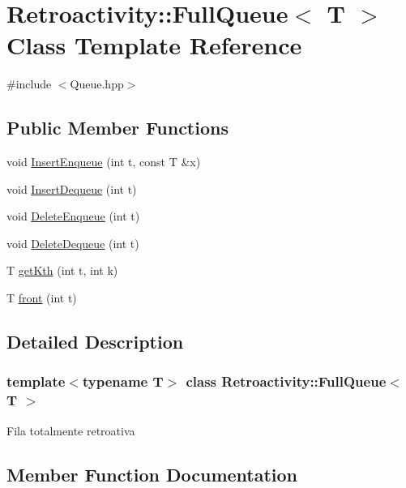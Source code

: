 \hypertarget{classRetroactivity_1_1FullQueue}{}\section{Retroactivity\+:\+:Full\+Queue$<$ T $>$ Class Template Reference}
\label{classRetroactivity_1_1FullQueue}


{\ttfamily \#include $<$Queue.\+hpp$>$}

\subsection*{Public Member Functions}
\begin{DoxyCompactItemize}
\item 
void \hyperlink{classRetroactivity_1_1FullQueue_a200afe69110074321a9f2b56ffc2e10f}{Insert\+Enqueue} (int t, const T \&x)
\item 
void \hyperlink{classRetroactivity_1_1FullQueue_acbdabeb03cf244b842df59fd64b86592}{Insert\+Dequeue} (int t)
\item 
void \hyperlink{classRetroactivity_1_1FullQueue_a017c3413e3df46315b1ffe23fdb9f52e}{Delete\+Enqueue} (int t)
\item 
void \hyperlink{classRetroactivity_1_1FullQueue_a45493d6d81b3982c43de25bc24a0d40f}{Delete\+Dequeue} (int t)
\item 
T \hyperlink{classRetroactivity_1_1FullQueue_a8924244b17024f26880e5dbc6b97ffdf}{get\+Kth} (int t, int k)
\item 
T \hyperlink{classRetroactivity_1_1FullQueue_ac29fbed2c33d09c0a7aac91fc26a0dd2}{front} (int t)
\end{DoxyCompactItemize}


\subsection{Detailed Description}
\subsubsection*{template$<$typename T$>$\newline
class Retroactivity\+::\+Full\+Queue$<$ T $>$}

Fila totalmente retroativa 

\subsection{Member Function Documentation}
\mbox{\label{classRetroactivity_1_1FullQueue_a45493d6d81b3982c43de25bc24a0d40f}} 
